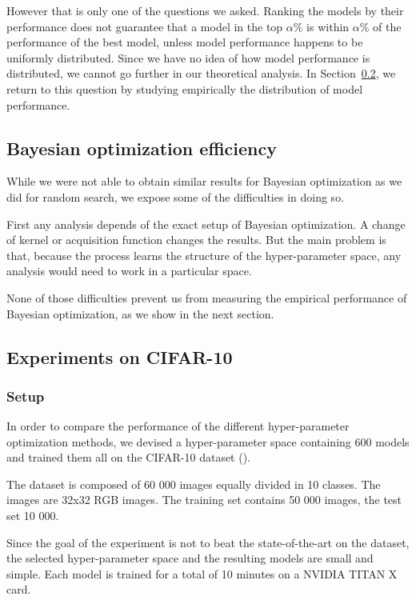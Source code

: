 However that is only one of the questions we asked. Ranking the models by their performance does not guarantee that a model in the top $\alpha \%$ is within $\alpha \%$ of the performance of the best model, unless model performance happens to be uniformly distributed. Since we have no idea of how model performance is distributed, we cannot go further in our theoretical analysis. In Section~\ref{ssec:cifar_analysis}, we return to this question by studying empirically the distribution of model performance.

\subsection{Bayesian optimization efficiency}

While we were not able to obtain similar results for Bayesian optimization as we did for random search, we expose some of the difficulties in doing so.

First any analysis depends of the exact setup of Bayesian optimization. A change of kernel or acquisition function changes the results. But the main problem is that, because the process learns the structure of the hyper-parameter space, any analysis would need to work in a particular space.

None of those difficulties prevent us from measuring the empirical performance of Bayesian optimization, as we show in the next section.

\subsection{Experiments on CIFAR-10}
\label{ssec:cifar_analysis}

\subsubsection{Setup}

In order to compare the performance of the different hyper-parameter optimization methods, we devised a hyper-parameter space containing 600 models and trained them all on the CIFAR-10 dataset (\textcite{krizhevsky2009}).

The dataset is composed of 60 000 images equally divided in 10 classes. The images are 32x32 RGB images. The training set contains 50 000 images, the test set 10 000.

Since the goal of the experiment is not to beat the state-of-the-art on the dataset, the selected hyper-parameter space and the resulting models are small and simple. Each model is trained for a total of 10 minutes on a NVIDIA TITAN X card. 

